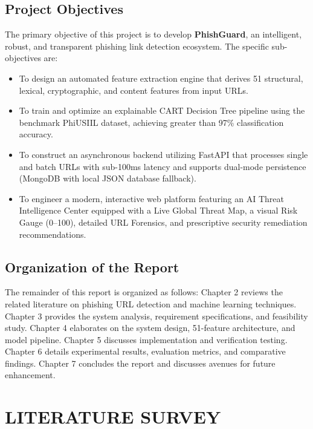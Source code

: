 \documentclass[BTech]{srmuthesis}
\begin{document}
\section{Project Objectives}
The primary objective of this project is to develop \textbf{PhishGuard}, an intelligent, robust, and transparent phishing link detection ecosystem. The specific sub-objectives are:
\begin{itemize}
    \item To design an automated feature extraction engine that derives 51 structural, lexical, cryptographic, and content features from input URLs.
    \item To train and optimize an explainable \ac{CART} Decision Tree pipeline using the benchmark PhiUSIIL dataset, achieving greater than 97\% classification accuracy.
    \item To construct an asynchronous backend utilizing FastAPI that processes single and batch URLs with sub-100ms latency and supports dual-mode persistence (MongoDB with local JSON database fallback).
    \item To engineer a modern, interactive web platform featuring an AI Threat Intelligence Center equipped with a Live Global Threat Map, a visual Risk Gauge (0--100), detailed URL Forensics, and prescriptive security remediation recommendations.
\end{itemize}

\section{Organization of the Report}
The remainder of this report is organized as follows: Chapter 2 reviews the related literature on phishing URL detection and machine learning techniques. Chapter 3 provides the system analysis, requirement specifications, and feasibility study. Chapter 4 elaborates on the system design, 51-feature architecture, and model pipeline. Chapter 5 discusses implementation and verification testing. Chapter 6 details experimental results, evaluation metrics, and comparative findings. Chapter 7 concludes the report and discusses avenues for future enhancement.

\chapter{LITERATURE SURVEY}
\label{chap:literature}
\end{document}
